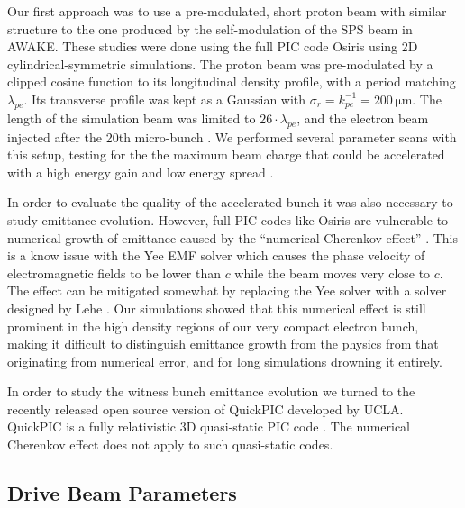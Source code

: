 \documentclass[aps,prstab,reprint,amsmath,amssymb,groupedaddress]{revtex4-1}
\newcommand{\unit}[1]{\,\mathrm{#1}}
\begin{document}
Our first approach was to use a pre-modulated, short proton beam with similar structure to the one produced by the
self-modulation of the SPS beam in AWAKE. These studies were done using the full PIC code Osiris \cite{fonseca:2002}
using 2D cylindrical-symmetric simulations. The proton beam was pre-modulated by a clipped cosine function to its
longitudinal density profile, with a period matching $\lambda_{pe}$. Its transverse profile was kept as a Gaussian with
$\sigma_{r} = k_{pe}^{-1} = 200\unit{\mu m}$. The length of the simulation beam was limited to $26\cdot\lambda_{pe}$,
and the electron beam injected after the 20th micro-bunch \cite{berglyd_olsen:2015}. We performed several parameter
scans with this setup, testing for the the maximum beam charge that could be accelerated with a high energy gain and low
energy spread \cite{adli:2016, berglyd_olsen:2016}.

In order to evaluate the quality of the accelerated bunch it was also necessary to study emittance evolution. However,
full PIC codes like Osiris are vulnerable to numerical growth of emittance caused by the ``numerical Cherenkov effect''
\cite{godfrey:1974}. This is a know issue with the Yee EMF solver which causes the phase velocity of electromagnetic
fields to be lower than $c$ while the beam moves very close to $c$. The effect can be mitigated somewhat by replacing
the Yee solver with a solver designed by Lehe \cite{lehe:2013}. Our simulations showed that this numerical effect is
still prominent in the high density regions of our very compact electron bunch, making it difficult to distinguish
emittance growth from the physics from that originating from numerical error, and for long simulations drowning it
entirely.

In order to study the witness bunch emittance evolution we turned to the recently released open source version of
QuickPIC developed by UCLA. QuickPIC is a fully relativistic 3D quasi-static PIC code \cite{huang:2006, an:2013}. The
numerical Cherenkov effect does not apply to such quasi-static codes.

\subsection[\label{S:M:Setup}]{Drive Beam Parameters}
\end{document}
